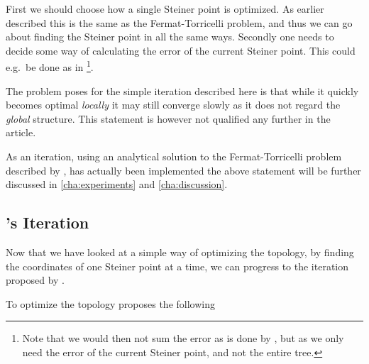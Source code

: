 First we should choose how a single Steiner point is optimized. As earlier
described this is the same as the Fermat-Torricelli problem, and thus we can go
about finding the Steiner point in all the same ways. Secondly one needs to
decide some way of calculating the error of the current Steiner point. This
could e.g.\ be done as in \textcite{smith1992}\footnote{Note that we would then
  not sum the error as is done by \citeauthor{smith1992}, but as we only need
  the error of the current Steiner point, and not the entire tree.}.

The problem \citeauthor{smith1992} poses for the simple iteration described here is that while it
quickly becomes optimal \textit{locally} it may still converge slowly as it does not
regard the \textit{global} structure. This statement is however not qualified
any further in the article.

As an iteration, using an analytical solution to the Fermat-Torricelli problem
described by \textcite{uteshev2014}, has actually been implemented the above
statement will be further discussed in \cref{cha:experiments} and \cref{cha:discussion}.

\subsection{\citeauthor{smith1992}'s Iteration}
\label{sec:smiths-iteration}

Now that we have looked at a simple way of optimizing the topology, by finding
the coordinates of one Steiner point at a time, we can progress to the iteration
proposed by \textcite{smith1992}.

To optimize the topology \citeauthor{smith1992} proposes the following


